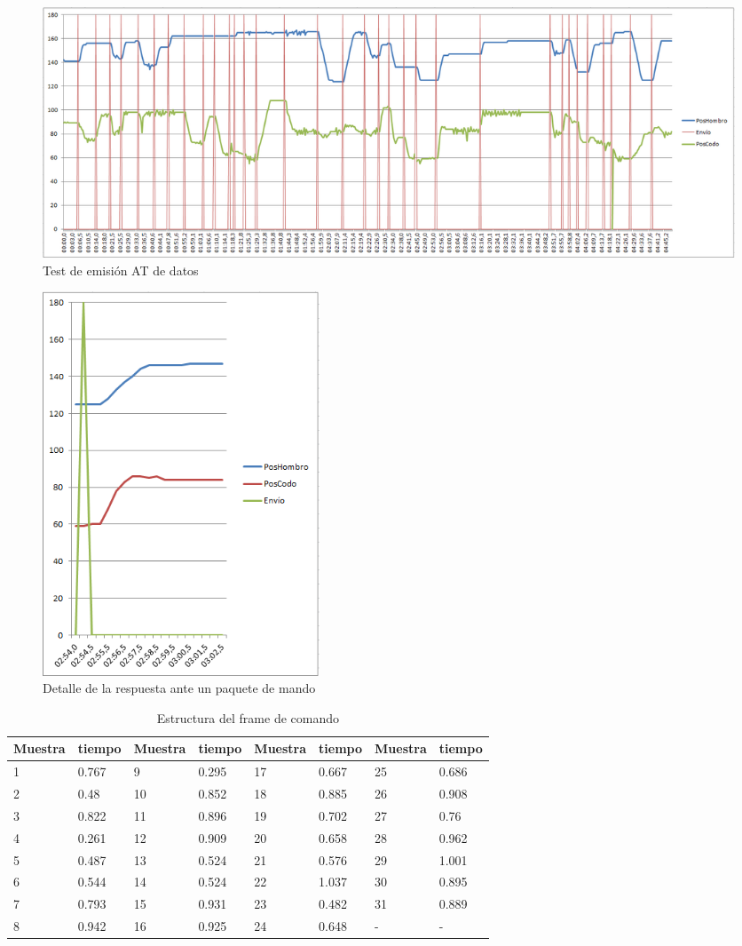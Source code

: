 \begin{figure}[H]
\centering
\includegraphics[width=1.1\textwidth]{figuras/temat.png}
\caption{Test de emisión AT de datos}
\end{figure}

\begin{figure}[H]
\centering
\includegraphics[width=0.4\textwidth]{figuras/tresp.png}
\caption{Detalle de la respuesta ante un paquete de mando}
\end{figure}

\begin{table}[H]
\begin{center}
\begin{tabular}{|m{15mm}|m{15mm}||m{15mm}|m{15mm}||m{15mm}|m{15mm}||m{15mm}|m{15mm}|}
\hline
\textbf{Muestra} & \textbf{tiempo} & \textbf{Muestra} & \textbf{tiempo} & \textbf{Muestra} & \textbf{tiempo} & \textbf{Muestra} & \textbf{tiempo}\\
\hline
1 & 0.767 & 9 & 0.295 & 17 & 0.667 & 25 & 0.686\\
\hline
2 & 0.48 & 10 & 0.852 & 18 & 0.885 & 26 & 0.908\\
\hline
3 & 0.822 & 11 & 0.896 & 19 & 0.702 & 27 & 0.76\\
\hline
4 & 0.261 & 12 & 0.909 & 20 & 0.658 & 28 & 0.962\\
\hline
5 & 0.487 & 13 & 0.524 & 21 & 0.576 & 29 & 1.001\\
\hline
6 & 0.544 & 14 & 0.524 & 22 & 1.037 & 30 & 0.895\\
\hline
7 & 0.793 & 15 & 0.931 & 23 & 0.482 & 31 & 0.889\\
\hline
8 & 0.942 & 16 & 0.925 & 24 & 0.648 & - & -\\
\hline
\end{tabular}
\end{center}
\caption{Estructura del frame de comando}
\label{tab:frameComando}
\end{table}

